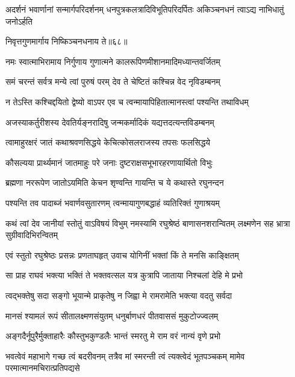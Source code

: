 \threelineshloka
{अदर्शनं भवार्णानां सन्मार्गपरिदर्शनम्}
{धनपुत्रकलत्रादिविभूतिपरिदर्पितः}
{अकिञ्चनधनं त्वाऽद्य नाभिधातुं जनोऽर्हति} %

\onelineshloka
{निवृत्तगुणमार्गाय निष्किञ्चनधनाय ते॥६८॥} %

\twolineshloka
{नमः स्वात्माभिरामाय निर्गुणाय गुणात्मने}
{कालरूपिणमीशानमादिमध्यान्तवर्जितम्} %

\twolineshloka
{समं चरन्तं सर्वत्र मन्ये त्वां पुरुषं परम्}
{देव ते चेष्टितं कश्चिन्न वेद नृविडम्बनम्} %

\twolineshloka
{न तेऽस्ति कश्चिद्दयितो द्वेष्यो वाऽपर एव च}
{त्वन्मायापिहितात्मानस्त्वां पश्यन्ति तथाविधम्} %

\twolineshloka
{अजस्याकर्तुरीशस्य देवतिर्यङ्नरादिषु}
{जन्मकर्मादिकं यद्यत्तदत्यन्तविडम्बनम्} %

\twolineshloka
{त्वामाहुरक्षरं जातं कथाश्रवणसिद्धये}
{केचित्कोसलराजस्य तपसः फलसिद्धये} %

\twolineshloka
{कौसल्यया प्रार्थ्यमानं जातमाहुः परे जनाः}
{दुष्टराक्षसभूभारहरणायार्थितो विभुः} %

\twolineshloka
{ब्रह्मणा नररूपेण जातोऽयमिति केचन}
{शृण्वन्ति गायन्ति च ये कथास्ते रघुनन्दन} %

\twolineshloka
{पश्यन्ति तव पादाब्जं भवार्णवसुतारणम्}
{त्वन्मायागुणबद्धाहं व्यतिरिक्तं गुणाश्रयम्} %

\threelineshloka
{कथं त्वां देव जानीयां स्तोतुं वाऽविषयं विभुम्}
{नमस्यामि रघुश्रेष्ठं बाणासनशरान्वितम्}
{लक्ष्मणेन सह भ्रात्रा सुग्रीवादिभिरन्वितम्} %

\twolineshloka
{एवं स्तुतो रघुश्रेष्ठः प्रसन्नः प्रणताघहृत्}
{उवाच योगिनीं भक्तां किं ते मनसि काङ्क्षितम्} %

\twolineshloka
{सा प्राह राघवं भक्त्या भक्तिं ते भक्तवत्सल}
{यत्र कुत्रापि जाताया निश्चलां देहि मे प्रभो} %

\twolineshloka
{त्वद्भक्तेषु सदा सङ्गो भूयान्मे प्राकृतेषु न}
{जिह्वा मे रामरामेति भक्त्या वदतु सर्वदा} %

\twolineshloka
{मानसं श्यामलं रूपं सीतालक्ष्मणसंयुतम्}
{धनुर्बाणधरं पीतवाससं मुकुटोज्ज्वलम्} %

\twolineshloka
{अङ्गदैर्नूपुरैर्मुक्ताहारैः कौस्तुभकुण्डलैः}
{भान्तं स्मरतु मे राम वरं नान्यं वृणे प्रभो} %


\threelineshloka
{भवत्वेवं महाभागे गच्छ त्वं बदरीवनम्}
{तत्रैव मां स्मरन्ती त्वं त्यक्त्वेदं भूतपञ्चकम्}
{मामेव परमात्मानमचिरात्प्रतिपद्यसे} %

